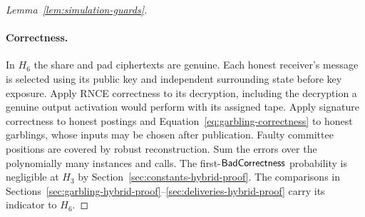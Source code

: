 \begin{proof}[Lemma~\ref{lem:simulation-guards}]
\paragraph{Correctness.}
In $H_6$ the share and pad ciphertexts are genuine.  Each honest
receiver's message is selected using its public key and independent
surrounding state before key exposure.  Apply RNCE correctness to
its decryption, including the decryption a genuine output activation
would perform with its assigned tape.  Apply signature correctness to
honest postings and Equation~\eqref{eq:garbling-correctness} to
honest garblings, whose inputs may be chosen after publication.
Faulty committee positions are covered by robust reconstruction.  Sum the errors over the polynomially many instances and calls.
The first-$\mathsf{BadCorrectness}$ probability is negligible at $H_3$
by Section~\ref{sec:constants-hybrid-proof}.  The comparisons in
Sections~\ref{sec:garbling-hybrid-proof}--\ref{sec:deliveries-hybrid-proof}
carry its indicator to $H_6$.


\end{proof}
